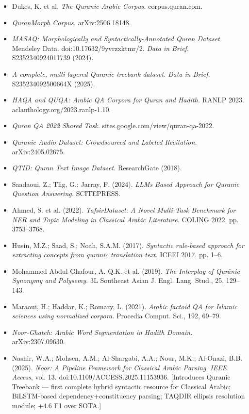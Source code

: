 \documentclass[12pt,a4paper]{article}
\providecommand{\tightlist}{\setlength{\itemsep}{0pt}\setlength{\parskip}{0pt}}
\begin{document}
\begin{itemize}
\tightlist
\item
  Dukes, K. et al. \emph{The Quranic Arabic Corpus.} corpus.quran.com.
\item
  \emph{QuranMorph Corpus.} arXiv:2506.18148.
\item
  \emph{MASAQ: Morphologically and Syntactically-Annotated Quran
  Dataset.} Mendeley Data. doi:10.17632/9yvrzxktmr/2. \emph{Data in
  Brief}, S2352340924011739 (2024).
\item
  \emph{A complete, multi-layered Quranic treebank dataset.} \emph{Data
  in Brief}, S235234092500664X (2025).
\item
  \emph{HAQA and QUQA: Arabic QA Corpora for Quran and Hadith.} RANLP
  2023. aclanthology.org/2023.ranlp-1.10.
\item
  \emph{Qur\textquotesingle an QA 2022 Shared Task.}
  sites.google.com/view/quran-qa-2022.
\item
  \emph{Quranic Audio Dataset: Crowdsourced and Labeled Recitation.}
  arXiv:2405.02675.
\item
  \emph{QTID: Quran Text Image Dataset.} ResearchGate (2018).
\item
  Saadaoui, Z.; Tlig, G.; Jarray, F. (2024). \emph{LLMs Based Approach
  for Quranic Question Answering.} SCITEPRESS.
\item
  Ahmed, S. et al. (2022). \emph{TafsirDataset: A Novel Multi-Task
  Benchmark for NER and Topic Modeling in Classical Arabic Literature.}
  COLING 2022. pp. 3753--3768.
\item
  Husin, M.Z.; Saad, S.; Noah, S.A.M. (2017). \emph{Syntactic rule-based
  approach for extracting concepts from quranic translation text.} ICEEI
  2017. pp. 1--6.
\item
  Mohammed Abdul-Ghafour, A.-Q.K. et al. (2019). \emph{The Interplay of
  Qur\textquotesingle ānic Synonymy and Polysemy.} 3L Southeast Asian J.
  Engl. Lang. Stud., 25, 129--143.
\item
  Maraoui, H.; Haddar, K.; Romary, L. (2021). \emph{Arabic factoid QA
  for Islamic sciences using normalized corpora.} Procedia Comput. Sci.,
  192, 69--79.
\item
  \emph{Noor-Ghateh: Arabic Word Segmentation in Hadith Domain.}
  arXiv:2307.09630.
\item
  Nashir, W.A.; Mohsen, A.M.; Al-Shargabi, A.A.; Nour, M.K.; Al-Onazi,
  B.B. (2025). \emph{Noor: A Pipeline Framework for Classical Arabic
  Parsing.} \emph{IEEE Access}, vol. 13.
  doi:10.1109/ACCESS.2025.11153936. {[}Introduces Quranic Treebank ---
  first complete hybrid syntactic resource for Classical Arabic;
  BiLSTM-based dependency+constituency parsing; TAQDIR ellipsis
  resolution module; +4.6 F1 over SOTA.{]}
\end{itemize}
\end{document}
